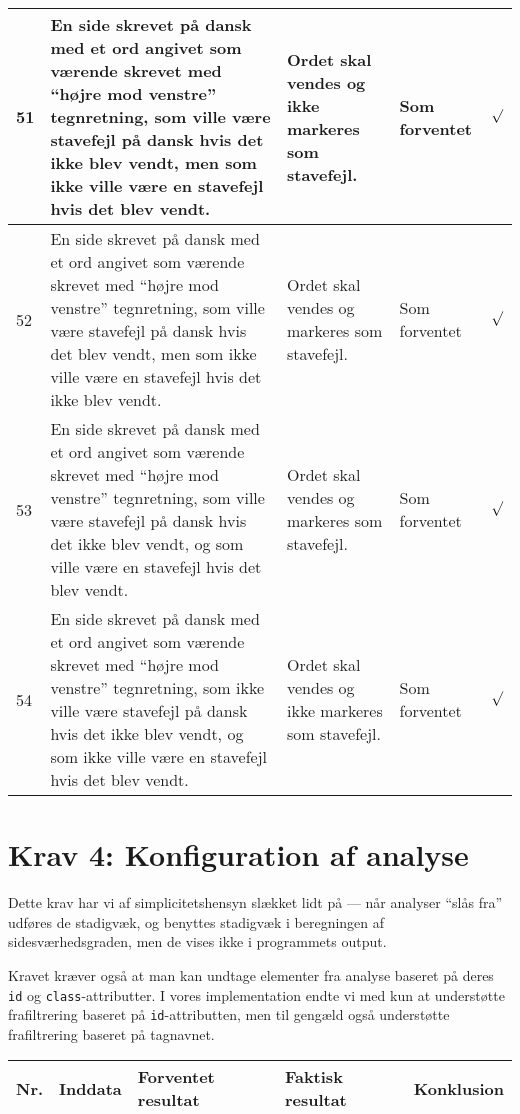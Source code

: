 \documentclass[a4paper,oneside,article]{memoir}
\begin{document}
\begin{landscape}
\begin{longtable}[c]{p{20pt}|p{220pt}|p{130pt}|p{130pt}|p{50pt}}
51 &
En side skrevet på dansk med et ord angivet som værende skrevet med
``højre mod venstre'' tegnretning, som ville være stavefejl på dansk
hvis det ikke blev vendt, men som ikke ville være en stavefejl hvis det blev vendt. &
Ordet skal vendes og ikke markeres som stavefejl. &
Som forventet &
$\surd$ \\ \hline

52 &
En side skrevet på dansk med et ord angivet som værende skrevet med
``højre mod venstre'' tegnretning, som ville være stavefejl på dansk
hvis det blev vendt, men som ikke ville være en stavefejl hvis det
ikke blev vendt. &
Ordet skal vendes og markeres som stavefejl. &
Som forventet &
$\surd$ \\ \hline

53 &
En side skrevet på dansk med et ord angivet som værende skrevet med
``højre mod venstre'' tegnretning, som ville være stavefejl på dansk
hvis det ikke blev vendt, og som ville være en stavefejl hvis det blev
vendt. &
Ordet skal vendes og markeres som stavefejl. &
Som forventet &
$\surd$ \\ \hline

54 &
En side skrevet på dansk med et ord angivet som værende skrevet med
``højre mod venstre'' tegnretning, som ikke ville være stavefejl på dansk
hvis det ikke blev vendt, og som ikke ville være en stavefejl hvis
det blev vendt. &
Ordet skal vendes og ikke markeres som stavefejl. &
Som forventet &
$\surd$ \\ \hline

\end{longtable}

\section{Krav 4: Konfiguration af analyse}

Dette krav har vi af simplicitetshensyn slækket lidt på --- når
analyser ``slås fra'' udføres de stadigvæk, og benyttes stadigvæk i
beregningen af sidesværhedsgraden, men de vises ikke i programmets
output.

Kravet kræver også at man kan undtage elementer fra analyse baseret på
deres \texttt{id} og \texttt{class}-attributter. I vores
implementation endte vi med kun at understøtte frafiltrering baseret
på \texttt{id}-attributten, men til gengæld også understøtte
frafiltrering baseret på tagnavnet.

\begin{longtable}[c]{p{20pt}|p{220pt}|p{130pt}|p{130pt}|p{50pt}}
\textbf{Nr.} &
\textbf{Inddata} &
\textbf{Forventet resultat} &
\textbf{Faktisk resultat} &
\textbf{Konklusion} \\ \hline


\end{longtable}
\end{landscape}
\end{document}

